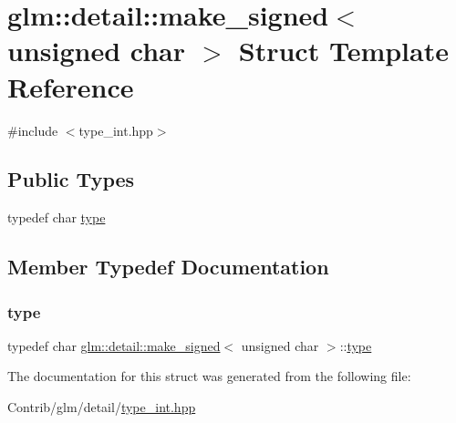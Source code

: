 \hypertarget{structglm_1_1detail_1_1make__signed_3_01unsigned_01char_01_4}{}\section{glm\+:\+:detail\+:\+:make\+\_\+signed$<$ unsigned char $>$ Struct Template Reference}
\label{structglm_1_1detail_1_1make__signed_3_01unsigned_01char_01_4}


{\ttfamily \#include $<$type\+\_\+int.\+hpp$>$}

\subsection*{Public Types}
\begin{DoxyCompactItemize}
\item 
typedef char \mbox{\hyperlink{structglm_1_1detail_1_1make__signed_3_01unsigned_01char_01_4_a38e3001baf7964626c6e7dff83b4ba95}{type}}
\end{DoxyCompactItemize}


\subsection{Member Typedef Documentation}
\mbox{\label{structglm_1_1detail_1_1make__signed_3_01unsigned_01char_01_4_a38e3001baf7964626c6e7dff83b4ba95}} 
\subsubsection{\texorpdfstring{type}{type}}
{\footnotesize\ttfamily typedef char \mbox{\hyperlink{structglm_1_1detail_1_1make__signed}{glm\+::detail\+::make\+\_\+signed}}$<$ unsigned char $>$\+::\mbox{\hyperlink{structglm_1_1detail_1_1make__signed_3_01unsigned_01char_01_4_a38e3001baf7964626c6e7dff83b4ba95}{type}}}



The documentation for this struct was generated from the following file\+:\begin{DoxyCompactItemize}
\item 
Contrib/glm/detail/\mbox{\hyperlink{type__int_8hpp}{type\+\_\+int.\+hpp}}\end{DoxyCompactItemize}
